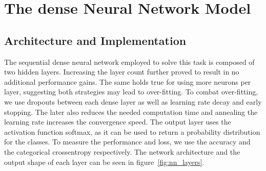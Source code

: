 \documentclass[
  12pt,
  bibliography=totoc,     %
  captions=tableheading,  %
  titlepage=firstiscover, %
]{scrartcl}
\begin{document}
\section{The dense Neural Network Model}
\subsection{Architecture and Implementation}
The sequential dense neural network employed to solve this task is composed of two hidden layers. Increasing the layer count further proved to result in no additional
performance gains. The same holds true for using more neurons per layer, suggesting both strategies may lead to over-fitting.
To combat over-fitting, we use dropouts between each dense layer as well as learning rate decay and early stopping.
The later also reduces the needed computation time and annealing the learning rate increases the convergence speed. The output layer uses the activation function softmax,
as it can be used to return a probability distribution for the classes. To measure the performance and loss, we use the accuracy and the categorical crossentropy respectively.
The network architecture and the output shape of each layer can be seen in figure~\ref{fig:nn_layers}.
\end{document}
